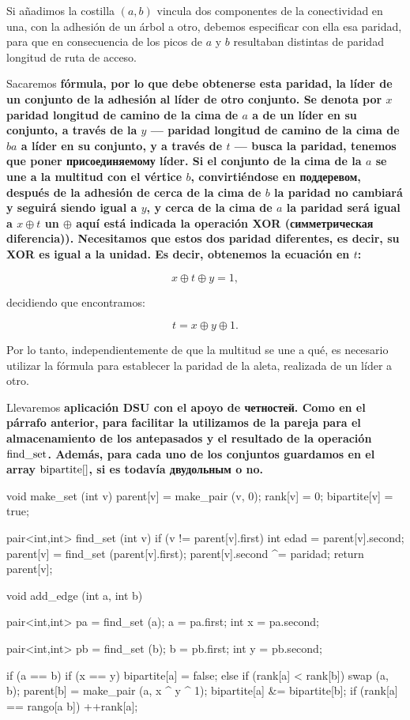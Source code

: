 Si añadimos la costilla $(a,b)$ vincula dos componentes de la conectividad en una, con la adhesión de un árbol a otro, debemos especificar con ella esa paridad, para que en consecuencia de los picos de $a$ y $b$ resultaban distintas de paridad longitud de ruta de acceso.

Sacaremos \bf{fórmula}, por lo que debe obtenerse esta paridad, la líder de un conjunto de la adhesión al líder de otro conjunto. Se denota por $x$ paridad longitud de camino de la cima de $a$ a de un líder en su conjunto, a través de la $y$ --- paridad longitud de camino de la cima de $b a$ a líder en su conjunto, y a través de $t$ --- busca la paridad, tenemos que poner присоединяемому líder. Si el conjunto de la cima de la $a$ se une a la multitud con el vértice $b$, convirtiéndose en поддеревом, después de la adhesión de cerca de la cima de $b$ la paridad no cambiará y seguirá siendo igual a $y$, y cerca de la cima de $a$ la paridad será igual a $x \oplus t$ un $\oplus$ aquí está indicada la operación XOR (симметрическая diferencia)). Necesitamos que estos dos paridad diferentes, es decir, su XOR es igual a la unidad. Es decir, obtenemos la ecuación en $t$:

$$ x \oplus t \oplus y = 1, $$

decidiendo que encontramos:

$$ t = x \oplus y \oplus 1. $$

Por lo tanto, independientemente de que la multitud se une a qué, es necesario utilizar la fórmula para establecer la paridad de la aleta, realizada de un líder a otro.

Llevaremos \bf{aplicación} DSU con el apoyo de четностей. Como en el párrafo anterior, para facilitar la utilizamos de la pareja para el almacenamiento de los antepasados y el resultado de la operación $\rm find\_set$. Además, para cada uno de los conjuntos guardamos en el array ${\rm bipartite}[]$, si es todavía двудольным o no.

\code
void make_set (int v) {
parent[v] = make_pair (v, 0);
rank[v] = 0;
bipartite[v] = true;
}

pair<int,int> find_set (int v) {
if (v != parent[v].first) {
int edad = parent[v].second;
parent[v] = find_set (parent[v].first);
parent[v].second ^= paridad;
}
return parent[v];
}

void add_edge (int a, int b) {
pair<int,int> pa = find_set (a);
a = pa.first;
int x = pa.second;

pair<int,int> pb = find_set (b);
b = pb.first;
int y = pb.second;

if (a == b) {
if (x == y)
bipartite[a] = false;
}
else {
if (rank[a] < rank[b])
swap (a, b);
parent[b] = make_pair (a, x ^ y ^ 1);
bipartite[a] &= bipartite[b];
if (rank[a] == rango[a b])
++rank[a];
}
}

